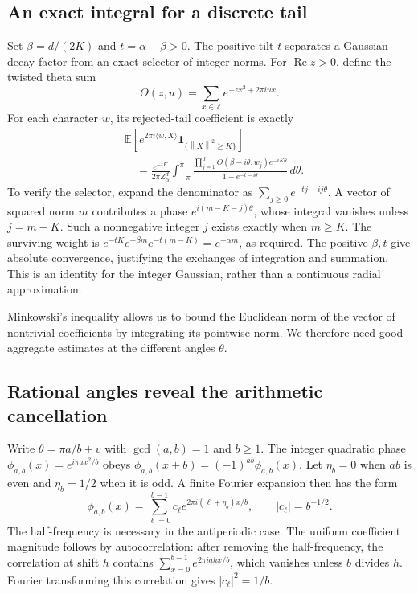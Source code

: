 \documentclass[11pt,a4paper]{article}
\newcommand{\Z}{\mathbb Z}
\newcommand{\E}{\mathbb E}
\newcommand{\norm}[1]{\left\lVert#1\right\rVert}
\theoremstyle{definition}
\theoremstyle{remark}
\numberwithin{equation}{section}
\begin{document}
\subsection{An exact integral for a discrete tail}

Set $\beta=d/(2K)$ and $t=\alpha-\beta>0$. The positive tilt $t$
separates a Gaussian decay factor from an exact selector of integer
norms. For $\operatorname{Re}z>0$, define the twisted theta sum
\[
 \Theta(z,u)=\sum_{x\in\Z}e^{-zx^2+2\pi iux}.
\]
For each character $w$, its rejected-tail coefficient is exactly
\begin{align}
 &\E\!\left[e^{2\pi i\langle w,X\rangle}
       \mathbf1_{\{\norm X^2\ge K\}}\right]\\
 &\quad=\frac{e^{-tK}}{2\pi Z_\alpha^d}
 \int_{-\pi}^{\pi}
 \frac{\prod_{j=1}^d\Theta(\beta-i\theta,w_j)
       e^{-iK\theta}}{1-e^{-t-i\theta}}\,d\theta.
 \label{eq:norm-contour}
\end{align}
To verify the selector, expand the denominator as
$\sum_{j\ge0}e^{-tj-ij\theta}$. A vector of squared norm $m$
contributes a phase $e^{i(m-K-j)\theta}$, whose integral vanishes unless
$j=m-K$. Such a nonnegative integer $j$ exists exactly when $m\ge K$.
The surviving weight is
$e^{-tK}e^{-\beta m}e^{-t(m-K)}=e^{-\alpha m}$, as required.
The positive $\beta,t$ give absolute convergence, justifying the
exchanges of integration and summation. This is an identity for the
integer Gaussian, rather than a continuous radial approximation.

Minkowski's inequality allows us to bound the Euclidean norm of the
vector of nontrivial coefficients by integrating its pointwise norm.
We therefore need good aggregate estimates at the different angles
$\theta$.

\subsection{Rational angles reveal the arithmetic cancellation}

Write $\theta=\pi a/b+v$ with $\gcd(a,b)=1$ and $b\ge1$. The integer
quadratic phase $\phi_{a,b}(x)=e^{i\pi ax^2/b}$ obeys
$\phi_{a,b}(x+b)=(-1)^{ab}\phi_{a,b}(x)$. Let $\eta_b=0$ when $ab$ is even and
$\eta_b=1/2$ when it is odd. A finite Fourier expansion then has the form
\[
 \phi_{a,b}(x)=\sum_{\ell=0}^{b-1}c_\ell
 e^{2\pi i(\ell+\eta_b)x/b},\qquad |c_\ell|=b^{-1/2}.
\]
The half-frequency is necessary in the antiperiodic case. The uniform
coefficient magnitude follows by autocorrelation: after removing the
half-frequency, the correlation at shift $h$ contains
$\sum_{x=0}^{b-1}e^{2\pi iahx/b}$, which vanishes unless $b$ divides
$h$. Fourier transforming this correlation gives
$|c_\ell|^2=1/b$.
\end{document}
